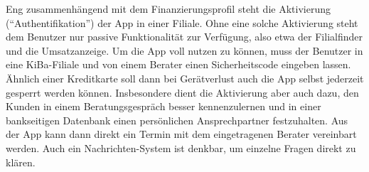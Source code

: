 	Eng zusammenhängend mit dem Finanzierungsprofil steht die Aktivierung ("`Authentifikation"') der App in einer Filiale. Ohne eine solche Aktivierung steht dem Benutzer nur passive Funktionalität zur Verfügung, also etwa der Filialfinder und die Umsatzanzeige. Um die App voll nutzen zu können, muss der Benutzer in eine KiBa-Filiale und von einem Berater einen Sicherheitscode eingeben lassen. Ähnlich einer Kreditkarte soll dann bei Gerätverlust auch die App selbst jederzeit gesperrt werden können. Insbesondere dient die Aktivierung aber auch dazu, den Kunden in einem Beratungsgespräch besser kennenzulernen und in einer bankseitigen Datenbank einen persönlichen Ansprechpartner festzuhalten. Aus der App kann dann direkt ein Termin mit dem eingetragenen Berater vereinbart werden. Auch ein Nachrichten-System ist denkbar, um einzelne Fragen direkt zu klären.